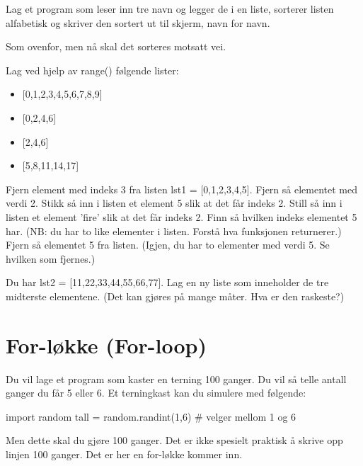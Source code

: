 \begin{exercise}
Lag et program som leser inn tre navn og legger de i en liste, sorterer listen alfabetisk og skriver den sortert ut til skjerm, navn for navn. 
\end{exercise}

\begin{exercise}
Som ovenfor, men nå skal det sorteres motsatt vei. 
\end{exercise}

\begin{exercise}
Lag ved hjelp av range() følgende lister:
\begin{itemize}
\item {[0,1,2,3,4,5,6,7,8,9]}
\item {[0,2,4,6]}
\item {[2,4,6]}
\item {[5,8,11,14,17]}
\end{itemize}
\end{exercise}

\begin{exercise}
Fjern element med indeks 3 fra listen lst1 = [0,1,2,3,4,5]. Fjern så elementet med verdi 2. Stikk så inn i listen et element 5 slik at det får indeks 2. Still så inn i listen et element 'fire' slik at det får indeks 2. Finn så hvilken indeks elementet 5 har. (NB: du har to like elementer i listen. Forstå hva funksjonen returnerer.) Fjern så elementet 5 fra listen. (Igjen, du har to elementer med verdi 5. Se hvilken som fjernes.)
\end{exercise}

\begin{exercise}
Du har lst2 = [11,22,33,44,55,66,77]. Lag en ny liste som inneholder de tre midterste elementene. (Det kan gjøres på mange måter. Hva er den raskeste?)
\end{exercise}

\section{For-løkke (For-loop)}

Du vil lage et program som kaster en terning 100 ganger. Du vil så telle antall ganger du får 5 eller 6. Et terningkast kan du simulere med følgende:

\begin{usncodebox}
import random
tall = random.randint(1,6)   # velger mellom 1 og 6
\end{usncodebox}

Men dette skal du gjøre 100 ganger. Det er ikke spesielt praktisk å skrive opp linjen 100 ganger. Det er her en for-løkke kommer inn. 

